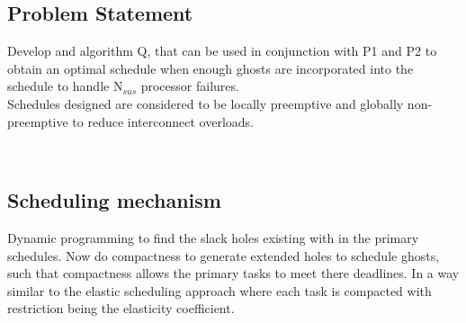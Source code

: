 \subsection*{Problem Statement}
Develop and algorithm Q, that can be used in conjunction with P1 and P2 to obtain an optimal schedule when enough ghosts are incorporated into the schedule to handle N$_{sus}$ processor failures.\\
Schedules designed are considered to be locally preemptive and globally non-preemptive to reduce interconnect overloads.\\
\begin{minipage}{\linewidth}%
\end{minipage}
\\
\subsection*{Scheduling mechanism}
Dynamic programming to find the slack holes existing with in the primary schedules. Now do compactness to generate extended holes to schedule ghosts, such that compactness allows the primary tasks to meet there deadlines. In a way similar to the elastic scheduling approach where each task is compacted with restriction being the elasticity coefficient.

